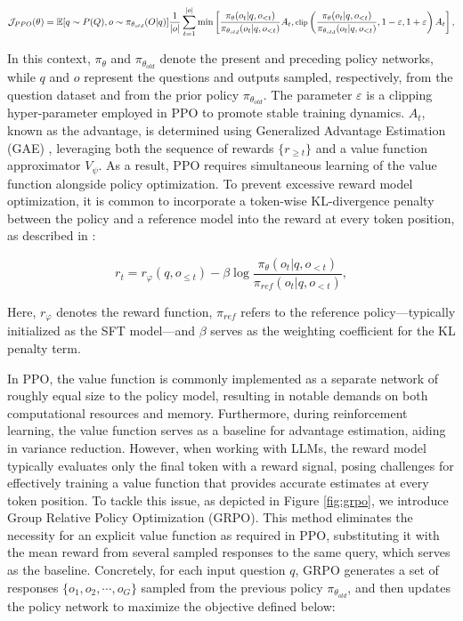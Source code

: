 \begin{itemize}[topsep=0pt]
\begin{equation}
\footnotesize
    \mathcal{J}_{PPO}(\theta) = \mathbb{E}{[q \sim P(Q), o \sim \pi_{\theta_{old}}(O|q)]} \frac{1}{|o|} \sum_{t=1}^{|o|} \min \left[ \frac{\pi_\theta(o_{t} | q, o_{<t})}{\pi_{\theta_{old}}(o_{t} | q, o_{<t})} A_{t}, \text{clip} \left( \frac{\pi_\theta(o_{t} | q, o_{<t})}{\pi_{\theta_{old}}(o_{t} | q, o_{<t})}, 1 - \varepsilon, 1 + \varepsilon \right)  A_{t} \right] ,
\end{equation}

In this context, $\pi_{\theta}$ and $\pi_{\theta_{old}}$ denote the present and preceding policy networks, while $q$ and $o$ represent the questions and outputs sampled, respectively, from the question dataset and from the prior policy $\pi_{\theta_{old}}$. The parameter $\varepsilon$ is a clipping hyper-parameter employed in PPO to promote stable training dynamics. $A_t$, known as the advantage, is determined using Generalized Advantage Estimation (GAE) \citep{gae}, leveraging both the sequence of rewards $\{r_{\ge t}\}$ and a value function approximator $V_{\psi}$. As a result, PPO requires simultaneous learning of the value function alongside policy optimization. To prevent excessive reward model optimization, it is common to incorporate a token-wise KL-divergence penalty between the policy and a reference model into the reward at every token position, as described in \citep{ouyang2022training}:

\begin{equation}
    r_{t} = r_\varphi(q, o_{\le t}) - \beta \log\frac{\pi_{\theta}(o_{t}|q, o_{<t})}{\pi_{ref}(o_{t}|q, o_{<t})},
\label{eq:PPO-reward}
\end{equation}

Here, $r_\varphi$ denotes the reward function, $\pi_{ref}$ refers to the reference policy—typically initialized as the SFT model—and $\beta$ serves as the weighting coefficient for the KL penalty term.

In PPO, the value function is commonly implemented as a separate network of roughly equal size to the policy model, resulting in notable demands on both computational resources and memory. Furthermore, during reinforcement learning, the value function serves as a baseline for advantage estimation, aiding in variance reduction. However, when working with LLMs, the reward model typically evaluates only the final token with a reward signal, posing challenges for effectively training a value function that provides accurate estimates at every token position. To tackle this issue, as depicted in Figure \ref{fig:grpo}, we introduce Group Relative Policy Optimization (GRPO). This method eliminates the necessity for an explicit value function as required in PPO, substituting it with the mean reward from several sampled responses to the same query, which serves as the baseline. Concretely, for each input question $q$, GRPO generates a set of responses $\{o_1, o_2, \cdots, o_G\}$ sampled from the previous policy $\pi_{\theta_{old}}$, and then updates the policy network to maximize the objective defined below:


\end{itemize}
